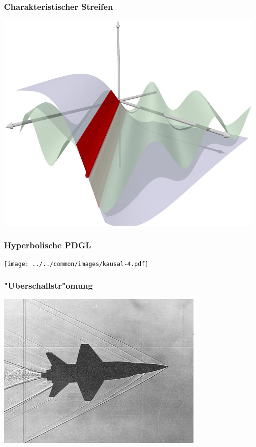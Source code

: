 \begin{frame}
\frametitle{Charakteristischer Streifen}
\begin{center}
\includegraphics[width=\hsize]{../../common/3d/streifen1.jpg}
\end{center}
\end{frame}


\begin{frame}
\frametitle{Hyperbolische PDGL}
\begin{center}
\texttt{[image: ../../common/images/kausal-4.pdf]}
\end{center}
\end{frame}

\begin{frame}
\frametitle{"Uberschallstr"omung}
\begin{center}
\includegraphics[width=\hsize]{../../common/graphics/i-5-1.jpg}
\end{center}
\end{frame}

